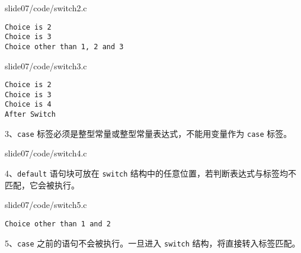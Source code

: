 \begin{frame}[fragile]\ft{\secname}
  
  {slide07/code/switch2.c}
\end{frame}

\begin{frame}[fragile]\ft{\secname}
\begin{lstlisting}[backgroundcolor=\color{blue!20}]
Choice is 2
Choice is 3
Choice other than 1, 2 and 3
\end{lstlisting}

\end{frame}

\begin{frame}[fragile]\ft{\secname}
  
  {slide07/code/switch3.c}
\end{frame}

\begin{frame}[fragile]\ft{\secname}
\begin{lstlisting}[backgroundcolor=\color{blue!20}]
Choice is 2
Choice is 3
Choice is 4
After Switch
\end{lstlisting}
\end{frame}


\begin{frame}[fragile]\ft{\secname}
3、\lstinline|case| 标签必须是整型常量或整型常量表达式，不能用变量作为 \lstinline|case| 标签。
\end{frame}

\begin{frame}[fragile]\ft{\secname}
  
  {slide07/code/switch4.c}
\end{frame}

\begin{frame}[fragile]\ft{\secname}
4、\lstinline|default| 语句块可放在 \lstinline|switch| 结构中的任意位置，若判断表达式与标签均不匹配，它会被执行。
\end{frame}

\begin{frame}[fragile]\ft{\secname}
  
  {slide07/code/switch5.c} \pause 
\begin{lstlisting}[backgroundcolor=\color{blue!20}]
Choice other than 1 and 2
\end{lstlisting}
\end{frame}


\begin{frame}\ft{\secname}
5、\lstinline|case| 之前的语句不会被执行。一旦进入 \lstinline|switch| 结构，将直接转入标签匹配。
\end{frame}

